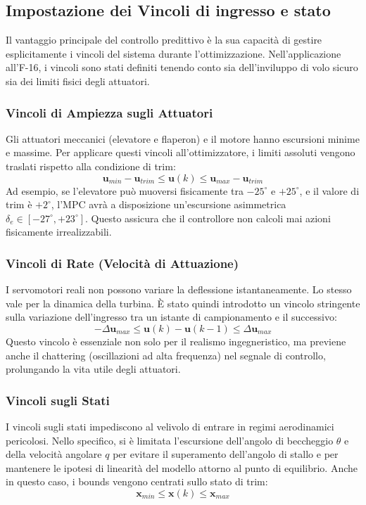 \subsection{Impostazione dei Vincoli di ingresso e stato}
Il vantaggio principale del controllo predittivo \`e la sua capacit\`a di gestire esplicitamente i vincoli del sistema durante l'ottimizzazione. Nell'applicazione all'F-16, i vincoli sono stati definiti tenendo conto sia dell'inviluppo di volo sicuro sia dei limiti fisici degli attuatori.
\subsubsection{Vincoli di Ampiezza sugli Attuatori}
Gli attuatori meccanici (elevatore e flaperon) e il motore hanno escursioni minime e massime. Per applicare questi vincoli all'ottimizzatore, i limiti assoluti vengono traslati rispetto alla condizione di trim:
\begin{equation}
	\mathbf{u}_{min} - \mathbf{u}_{trim} \le \mathbf{u}(k) \le \mathbf{u}_{max} - \mathbf{u}_{trim}
\end{equation}
Ad esempio, se l'elevatore pu\`o muoversi fisicamente tra $-25^\circ$ e $+25^\circ$, e il valore di trim \`e $+2^\circ$, l'MPC avr\`a a disposizione un'escursione asimmetrica $\delta_e \in [-27^\circ, +23^\circ]$. Questo assicura che il controllore non calcoli mai azioni fisicamente irrealizzabili.
\subsubsection{Vincoli di Rate (Velocit\`a di Attuazione)}
I servomotori reali non possono variare la deflessione istantaneamente. Lo stesso vale per la dinamica della turbina. \`E stato quindi introdotto un vincolo stringente sulla variazione dell'ingresso tra un istante di campionamento e il successivo:
\begin{equation}
	-\Delta\mathbf{u}_{max} \le \mathbf{u}(k) - \mathbf{u}(k-1) \le \Delta\mathbf{u}_{max}
\end{equation}
Questo vincolo \`e essenziale non solo per il realismo ingegneristico, ma previene anche il chattering (oscillazioni ad alta frequenza) nel segnale di controllo, prolungando la vita utile degli attuatori.
\subsubsection{Vincoli sugli Stati}
I vincoli sugli stati impediscono al velivolo di entrare in regimi aerodinamici pericolosi. Nello specifico, si \`e limitata l'escursione dell'angolo di beccheggio $\theta$ e della velocit\`a angolare $q$ per evitare il superamento dell'angolo di stallo e per mantenere le ipotesi di linearit\`a del modello attorno al punto di equilibrio. Anche in questo caso, i bounds vengono centrati sullo stato di trim:
\begin{equation}
	\mathbf{x}_{min} \le \mathbf{x}(k) \le \mathbf{x}_{max}
\end{equation}

